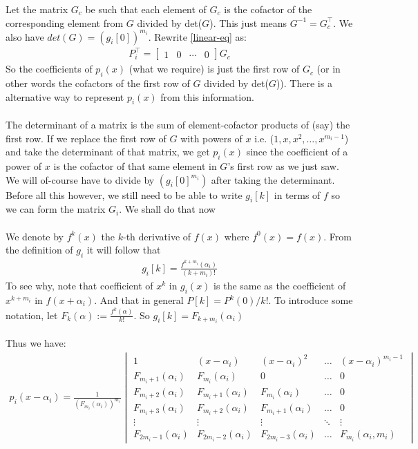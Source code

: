 \documentclass{article}
\begin{document}
Let the matrix $G_c$ be such that each element of $G_c$ is the cofactor of the corresponding element from $G$ divided by det($G$). This just means $G^{-1} = G_c^\top $. We also have $det(G) = (g_i[0])^{m_i}$. Rewrite \eqref{linear-eq} as:
\begin{align}
    P_i^{\top} = \begin{bmatrix}1 & 0 & \cdots & 0\end{bmatrix} G_c
\end{align}
So the coefficients of $p_i(x)$ (what we require) is just the first row of $G_c$ (or in other words the cofactors of the first row of $G$ divided by det($G$)). There is a alternative way to represent $p_i(x)$ from this information.
\\\\
\newpage
The determinant of a matrix is the sum of element-cofactor products of (say) the first row. If we replace the first row of $G$ with powers of $x$ i.e. ($1,x,x^2,\dots,x^{m_i-1}$) and take the determinant of that matrix, we get $p_i(x)$ since the coefficient of a power of $x$ is the cofactor of that same element in $G$'s first row as we just saw. We will of-course have to divide by $(g_i[0]^{m_i})$ after taking the determinant. Before all this however, we still need to be able to write $g_i[k]$ in terms of $f$ so we can form the matrix $G_i$. We shall do that now
\\\\
We denote by $f^k(x)$ the $k$-th derivative of $f(x)$ where $f^0(x) = f(x)$. From the definition of $g_i$ it will follow that
\begin{align}
    g_i[k] = \frac{f^{k+m_i}(\alpha_i)}{(k+m_i)!}
\end{align}
To see why, note that coefficient of $x^k$ in $g_i(x)$ is the same as the coefficient of $x^{k+m_i}$ in $f(x+\alpha_i)$. And that in general $P[k] = P^k(0)/k!$. To introduce some notation, let $F_k(\alpha) := \frac{f^k(\alpha)}{k!}$. So $g_i[k] = F_{k+m_i}(\alpha_i)$
\\\\
Thus we have:
\begin{align}
    p_i(x-\alpha_i) = \frac{1}{(F_{m_i}(\alpha_i))^{m_i}}\begin{vmatrix}
    1 & (x-\alpha_i) & (x-\alpha_i)^2 &  \dots  & (x-\alpha_i)^{m_i-1} \\
    F_{m_i+1}(\alpha_i) & F_{m_i}(\alpha_i) & 0 &\dots  & 0 \\
    F_{m_i+2}(\alpha_i) & F_{m_i+1}(\alpha_i) & F_{m_i}(\alpha_i) & \dots  & 0 \\
    F_{m_i+3}(\alpha_i) & F_{m_i+2}(\alpha_i) & F_{m_i+1}(\alpha_i)  & \dots  & 0 \\
    \vdots & \vdots & \vdots & \ddots & \vdots \\
    F_{2m_i-1}(\alpha_i) & F_{2m_i-2}(\alpha_i) & F_{2m_i-3}(\alpha_i) & \dots  & F_{m_i}(\alpha_i, m_i)
\end{vmatrix}
\end{align}
\end{document}
